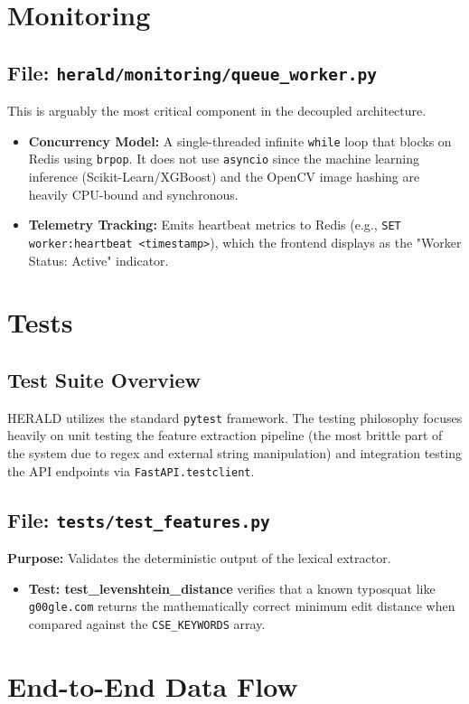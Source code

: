 \documentclass[12pt,a4paper]{report}
\begin{document}
\chapter{Monitoring}
\section{File: \texttt{herald/monitoring/queue\_worker.py}}
This is arguably the most critical component in the decoupled architecture.
\begin{itemize}
\item \textbf{Concurrency Model:} A single-threaded infinite \texttt{while} loop that blocks on Redis using \texttt{brpop}. It does not use \texttt{asyncio} since the machine learning inference (Scikit-Learn/XGBoost) and the OpenCV image hashing are heavily CPU-bound and synchronous.
\item \textbf{Telemetry Tracking:} Emits heartbeat metrics to Redis (e.g., \texttt{SET worker:heartbeat <timestamp>}), which the frontend displays as the "Worker Status: Active" indicator.
\end{itemize}

\chapter{Tests}
\section{Test Suite Overview}
HERALD utilizes the standard \texttt{pytest} framework. The testing philosophy focuses heavily on unit testing the feature extraction pipeline (the most brittle part of the system due to regex and external string manipulation) and integration testing the API endpoints via \texttt{FastAPI.testclient}.

\section{File: \texttt{tests/test\_features.py}}
\textbf{Purpose:} Validates the deterministic output of the lexical extractor.
\begin{itemize}
\item \textbf{Test: test\_levenshtein\_distance} verifies that a known typosquat like \texttt{g00gle.com} returns the mathematically correct minimum edit distance when compared against the \texttt{CSE\_KEYWORDS} array.
\end{itemize}

\chapter{End-to-End Data Flow}
\end{document}
